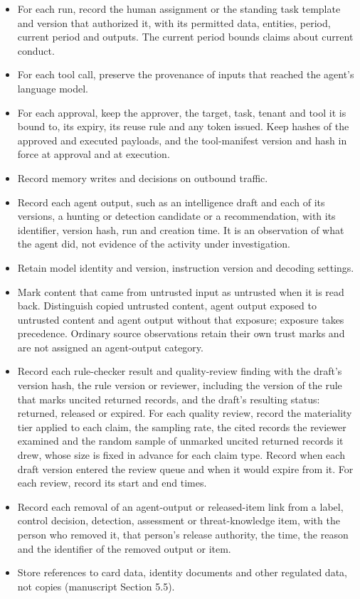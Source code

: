 \documentclass[
  11pt,
]{article}
\providecommand{\tightlist}{%
  \setlength{\itemsep}{0pt}\setlength{\parskip}{0pt}}
\renewcommand{\tightlist}{\setlength{\itemsep}{0pt plus 1pt}\setlength{\parskip}{0pt}}
\begin{document}
\begin{itemize}
\tightlist
\item
  For each run, record the human assignment or the standing task
  template and version that authorized it, with its permitted data,
  entities, period, current period and outputs. The current period
  bounds claims about current conduct.
\item
  For each tool call, preserve the provenance of inputs that reached the
  agent's language model.
\item
  For each approval, keep the approver, the target, task, tenant and
  tool it is bound to, its expiry, its reuse rule and any token issued.
  Keep hashes of the approved and executed payloads, and the
  tool-manifest version and hash in force at approval and at execution.
\item
  Record memory writes and decisions on outbound traffic.
\item
  Record each agent output, such as an intelligence draft and each of
  its versions, a hunting or detection candidate or a recommendation,
  with its identifier, version hash, run and creation time. It is an
  observation of what the agent did, not evidence of the activity under
  investigation.
\item
  Retain model identity and version, instruction version and decoding
  settings.
\item
  Mark content that came from untrusted input as untrusted when it is
  read back. Distinguish copied untrusted content, agent output exposed
  to untrusted content and agent output without that exposure; exposure
  takes precedence. Ordinary source observations retain their own trust
  marks and are not assigned an agent-output category.
\item
  Record each rule-checker result and quality-review finding with the
  draft's version hash, the rule version or reviewer, including the
  version of the rule that marks uncited returned records, and the
  draft's resulting status: returned, released or expired. For each
  quality review, record the materiality tier applied to each claim, the
  sampling rate, the cited records the reviewer examined and the random
  sample of unmarked uncited returned records it drew, whose size is
  fixed in advance for each claim type. Record when each draft version
  entered the review queue and when it would expire from it. For each
  review, record its start and end times.
\item
  Record each removal of an agent-output or released-item link from a
  label, control decision, detection, assessment or threat-knowledge
  item, with the person who removed it, that person's release authority,
  the time, the reason and the identifier of the removed output or item.
\item
  Store references to card data, identity documents and other regulated
  data, not copies (manuscript Section 5.5).
\end{itemize}
\end{document}
